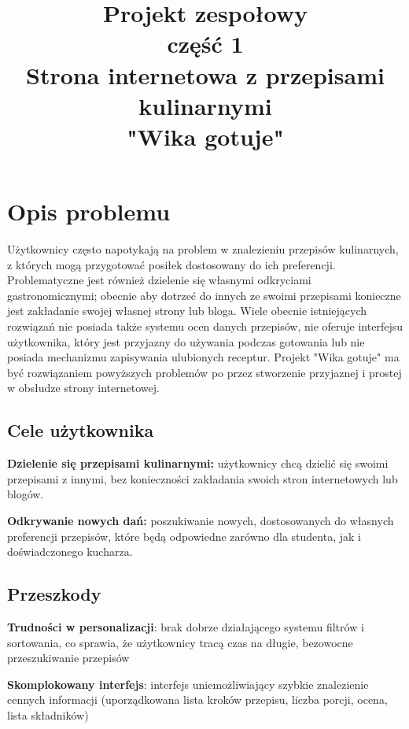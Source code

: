 \documentclass{article}
\title{\fontsize{20}{22}\selectfont Projekt zespołowy\\ część 1\\Strona internetowa z przepisami kulinarnymi\\"Wika gotuje"}
\date{}
\newenvironment{itemize.zip}
{ \begin{itemize}
    \setlength{\itemsep}{0pt}
    \setlength{\parskip}{0pt}
    \setlength{\parsep}{0pt}     }
{ \end{itemize}                  }
\begin{document}
\section{Opis problemu}
\noindent
Użytkownicy często napotykają na problem w znalezieniu przepisów kulinarnych, z których mogą przygotować posiłek dostosowany do ich preferencji. Problematyczne jest również dzielenie
się własnymi odkryciami gastronomicznymi; obecnie aby dotrzeć do innych ze swoimi przepisami konieczne jest zakładanie swojej własnej strony lub bloga. Wiele obecnie istniejących
rozwiązań nie posiada także systemu ocen danych przepisów, nie oferuje interfejsu użytkownika, który jest przyjazny do używania podczas gotowania lub nie posiada mechanizmu zapisywania
ulubionych receptur. Projekt "Wika gotuje" ma być rozwiązaniem powyższych problemów po przez stworzenie przyjaznej i prostej w obsłudze strony internetowej.

\subsection{Cele użytkownika}
\begin{itemize.zip}
    \item \textbf{Dzielenie się przepisami kulinarnymi:} użytkownicy chcą dzielić się swoimi przepisami z innymi, bez konieczności zakładania swoich stron internetowych lub blogów.
    \item \textbf{Odkrywanie nowych dań:} poszukiwanie nowych, dostosowanych do własnych preferencji przepisów, które będą odpowiedne zarówno dla studenta, jak i doświadczonego kucharza.
\end{itemize.zip}

\subsection{Przeszkody}
\begin{itemize.zip}
    \item \textbf{Trudności w personalizacji}: brak dobrze działającego systemu filtrów i sortowania, co sprawia, że użytkownicy tracą czas na długie, bezowocne przeszukiwanie przepisów
    \item \textbf{Skomplokowany interfejs}: interfejs uniemożliwiający szybkie znalezienie cennych informacji (uporządkowana lista kroków przepisu, liczba porcji, ocena, lista składników)
\end{itemize.zip}
\end{document}
